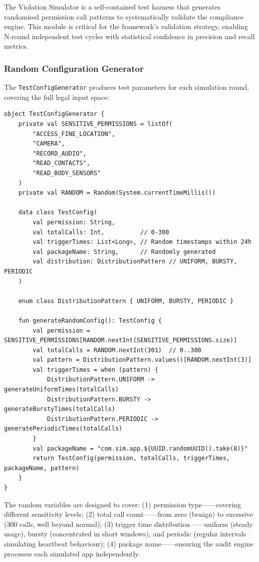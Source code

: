 The Violation Simulator is a self-contained test harness that generates randomised permission call patterns to systematically validate the compliance engine. This module is critical for the framework's validation strategy, enabling N-round independent test cycles with statistical confidence in precision and recall metrics.

\subsubsection{Random Configuration Generator}

The \texttt{TestConfigGenerator} produces test parameters for each simulation round, covering the full legal input space:

\begin{lstlisting}[caption=Random configuration generation]
object TestConfigGenerator {
    private val SENSITIVE_PERMISSIONS = listOf(
        "ACCESS_FINE_LOCATION",
        "CAMERA",
        "RECORD_AUDIO",
        "READ_CONTACTS",
        "READ_BODY_SENSORS"
    )
    private val RANDOM = Random(System.currentTimeMillis())
    
    data class TestConfig(
        val permission: String,
        val totalCalls: Int,          // 0-300
        val triggerTimes: List<Long>, // Random timestamps within 24h
        val packageName: String,      // Randomly generated
        val distribution: DistributionPattern // UNIFORM, BURSTY, PERIODIC
    )
    
    enum class DistributionPattern { UNIFORM, BURSTY, PERIODIC }
    
    fun generateRandomConfig(): TestConfig {
        val permission = SENSITIVE_PERMISSIONS[RANDOM.nextInt(SENSITIVE_PERMISSIONS.size)]
        val totalCalls = RANDOM.nextInt(301)  // 0..300
        val pattern = DistributionPattern.values()[RANDOM.nextInt(3)]
        val triggerTimes = when (pattern) {
            DistributionPattern.UNIFORM -> generateUniformTimes(totalCalls)
            DistributionPattern.BURSTY -> generateBurstyTimes(totalCalls)
            DistributionPattern.PERIODIC -> generatePeriodicTimes(totalCalls)
        }
        val packageName = "com.sim.app.${UUID.randomUUID().take(8)}"
        return TestConfig(permission, totalCalls, triggerTimes, packageName, pattern)
    }
}
\end{lstlisting}

The random variables are designed to cover: (1) permission type——covering different sensitivity levels; (2) total call count——from zero (benign) to excessive (300 calls, well beyond normal); (3) trigger time distribution——uniform (steady usage), bursty (concentrated in short windows), and periodic (regular intervals simulating heartbeat behaviour); (4) package name——ensuring the audit engine processes each simulated app independently.

